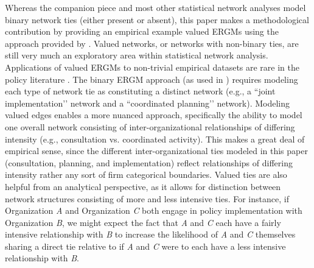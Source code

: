 \documentclass[12pt,a4paper,titlepage]{article}
\begin{document}
Whereas the \textcite{scott2015-a} companion piece and most other statistical network analyses model binary network ties (either present or absent), this paper makes a methodological contribution by providing an empirical example valued ERGMs using the approach provided by \parencite{krivitsky2013}. Valued networks, or networks with non-binary ties, are still very much an exploratory area within statistical network analysis. Applications of valued ERGMs to non-trivial empirical datasets are rare in the policy literature \parencite{desmarais2012-a, krivitsky2012, krivitsky2013}. The binary ERGM approach (as used in \textcite{scott2015-a}) requires modeling each type of network tie as constituting a distinct network (e.g., a ``joint implementation’’ network and a ``coordinated planning’’ network). Modeling valued edges enables a more nuanced approach, specifically the ability to model one overall network consisting of inter-organizational relationships of differing intensity (e.g., consultation vs. coordinated activity). This makes a great deal of empirical sense, since the different inter-organizational ties modeled in this paper (consultation, planning, and implementation) reflect relationships of differing intensity rather any sort of firm categorical boundaries. Valued ties are also helpful from an analytical perspective, as it allows for distinction between network structures consisting of more and less intensive ties. For instance, if Organization \textit{A} and Organization \textit{C} both engage in policy implementation with Organization \textit{B}, we might expect the fact that \textit{A} and \textit{C} each have a fairly intensive relationship with \textit{B} to increase the likelihood of \textit{A} and \textit{C} themselves sharing a direct tie relative to if \textit{A} and \textit{C} were to each have a less intensive relationship with \textit{B}.
\end{document}

